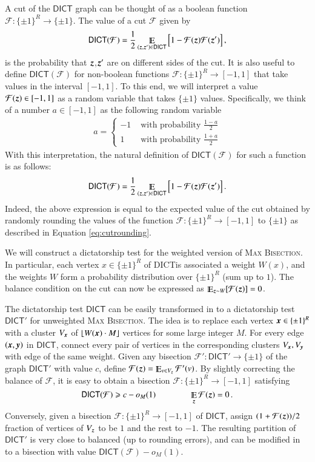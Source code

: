 \documentclass[11pt]{article}
\theoremstyle{definition}
\newcommand{\Esymb}{\mathbb{E}}
\DeclareMathOperator*{\E}{\Esymb}
\newcommand{\sbits}{\{\pm1\}}
\newcommand{\mper}{\,.}
\newcommand{\mcom}{\,,}
\newcommand{\problemmacro}[1]{\texorpdfstring{\textsc{#1}}{#1}\xspace}
\newcommand{\maxbisection}{\problemmacro{Max Bisection}}
\newcommand{\cF}{\mathcal F}
\renewcommand{\geq}{\geqslant}
\numberwithin{equation}{section}
\newcommand{\dict} {\textsf{DICT}}
\newcommand{\mrv}[1]{\bm{\lowercase{#1}}}
\begin{document}
A cut of the $\dict$ graph can be thought of as a boolean function
	$\cF : \sbits^R \to \sbits$.  The value	of a cut $\cF$ given by
		$$ \dict(\cF) = \frac{1}{2}\E_{ (\mrv{z}, \mrv{z}')\in
\dict} \Big[
		1 - \cF(\mrv{z}) \cF(\mrv{z}') \Big] \mcom$$
	is the probability that $\mrv{z}$,$\mrv{z}'$ are on
different sides of the cut.
		It is also useful to define $\dict(\cF)$ for non-boolean
	functions $\cF: \sbits^R \to [-1,1]$ that take values
	in the interval $[-1,1]$.  To this end, we will interpret a
	value $\cF(\mrv{z}) \in [-1,1]$ as a random variable that
	takes $\sbits$ values.  Specifically, we think of a number $a
	\in [-1,1]$ as the following random variable
	\begin{align} \label{eq:cutrounding}
	a = \begin{cases} -1 & \text{ with probability }
		\frac{1-a}{2} \\
		1 & \text{ with probability } \frac{1+a}{2}
		\end{cases}
	\end{align}
	With this interpretation, the natural definition of
	$\dict(\cF)$ for such a function is as follows:
	$$  \dict(\cF) = \frac{1}{2}\E_{ (\mrv{z}, \mrv{z}') \in
	\dict} \Big[
		1 - \cF(\mrv{z}) \cF(\mrv{z}') \Big] \mper $$
	Indeed, the above expression is equal to the expected value of the
	cut obtained by randomly rounding the values of the function
	$\cF : \sbits^{R} \to [-1,1]$ to $\sbits$ as
	described in Equation \eqref{eq:cutrounding}.

	We will construct a dictatorship test for the weighted version
	of \maxbisection.  In particular, each vertex $x \in \sbits^R$ of \dict is
	associated a weight $W(x)$, and the weights $W$ form a
	probability distribution over $\sbits^R$ (sum up to $1$).  The
	balance condition on the cut can now be expressed as
	$\E_{\mrv{z}
	\sim W}[\cF(\mrv{z})] = 0$.

The dictatorship test $\dict$ can be easily
	transformed in to a dictatorship test $\dict'$ for unweighted
	\maxbisection.  The idea is to replace each vertex $\mrv{x} \in
	\sbits^R$ with a cluster $V_{\mrv{x}}$ of $\lfloor W(\mrv{x}) \cdot M \rfloor$
	vertices for some large integer $M$.  For every edge
	$(\mrv{x},\mrv{y})$ in $\dict$, connect every pair of vertices
	in the corresponding clusters $V_{\mrv{x}},V_{\mrv{y}}$ with
	edge of the same weight.  Given any bisection $\cF' : \dict'
	\to \sbits$ of the graph $\dict'$
	with value $c$, define $\cF(\mrv{z}) = \E_{v \in V_{\mrv{z}}}
	\cF'(v)$.  By slightly correcting the balance of $\cF$, it is
	easy to obtain a bisection $\cF : \sbits^R \to [-1,1]$
	satisfying
	$$ \dict(\cF) \geq c - o_{M}(1)  \qquad \qquad \E_{\mrv{z}}
	\cF(\mrv{z}) = 0 \mper$$
	Conversely, given a bisection $\cF : \sbits^R \to [-1,1]$ of
	$\dict$, assign $(1+\cF(\mrv{z}))/2$ fraction of vertices of
	$V_{\mrv{z}}$ to be $1$ and the rest to $-1$.  The resulting
	partition of $\dict'$ is very close to balanced (up to
	rounding errors), and can be modified in to a bisection with
	value $\dict(\cF) - o_{M}(1)$.
\end{document}
